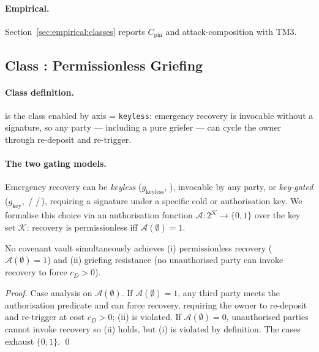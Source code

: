 \paragraph{Empirical.} Section~\ref{sec:empirical:classes} reports
$C_{\text{pin}}$ and attack-composition with TM3.

\subsection{Class \classgrief{}: Permissionless Griefing}
\label{sec:imposs:class_grief}

\paragraph{Class definition.} \classgrief{} is the class enabled by
axis \axauth{} = \texttt{keyless}: emergency recovery is invocable
without a signature, so any party --- including a pure griefer ---
can cycle the owner through re-deposit and re-trigger.

\paragraph{The two gating models.} Emergency recovery can be
\emph{keyless} ($g_{\text{keyless}}$, \opccv{}), invocable by any
party, or \emph{key-gated} ($g_{\text{key}}$,
\opctv{}\,/\,\opvault{}\,/\,\catcsfs{}), requiring a signature under a
specific cold or authorisation key. We formalise this choice via an
authorisation function
$\mathcal{A}\colon 2^{\mathcal{K}} \to \{0,1\}$ over the key set
$\mathcal{K}$: recovery is permissionless iff
$\mathcal{A}(\emptyset) = 1$.

\begin{proposition}
\label{thm:griefing_safety}
No covenant vault simultaneously achieves (i) permissionless
recovery ($\mathcal{A}(\emptyset) = 1$) and (ii) griefing
resistance (no unauthorised party can invoke recovery to force
$c_D > 0$).
\end{proposition}

\begin{proof}
Case analysis on $\mathcal{A}(\emptyset)$. If
$\mathcal{A}(\emptyset) = 1$, any third party meets the
authorisation predicate and can force recovery, requiring the
owner to re-deposit and re-trigger at cost $c_D > 0$; (ii) is
violated. If $\mathcal{A}(\emptyset) = 0$, unauthorised parties
cannot invoke recovery so (ii) holds, but (i) is violated by
definition. The cases exhaust
$\{0, 1\}$. \qed
\end{proof}

